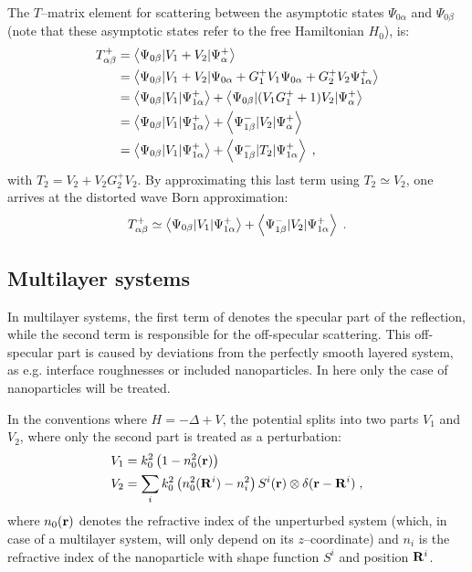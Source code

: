 The $T$--matrix element for scattering between the asymptotic states $\Psi_{0\alpha}$ and $\Psi_{0\beta}$ (note that these asymptotic states refer to the free Hamiltonian $H_0$), is:
\begin{align*}
  T^+_{\alpha\beta} &= \left\langle \Psi_{0\beta} \vert V_1+V_2 \vert \Psi^+_\alpha \right\rangle \nonumber \\
  & = \left\langle \Psi_{0\beta} \vert V_1+V_2 \vert \Psi_{0\alpha} + G^+_1V_1\Psi_{0\alpha} + G^+_2V_2\Psi^+_{1\alpha} \right\rangle \nonumber \\
  & = \left\langle \Psi_{0\beta} \vert V_1 \vert \Psi^+_{1\alpha} \right\rangle + \left\langle \Psi_{0\beta} \vert (V_1G^+_1 + 1)V_2 \vert \Psi^+_\alpha \right\rangle \\
  & = \left\langle \Psi_{0\beta} \vert V_1 \vert \Psi^+_{1\alpha} \right\rangle + \left\langle \Psi^-_{1\beta} \vert V_2 \vert \Psi^+_\alpha \right\rangle \nonumber \\
  & = \left\langle \Psi_{0\beta} \vert V_1 \vert \Psi^+_{1\alpha} \right\rangle + \left\langle \Psi^-_{1\beta} \vert T_2 \vert \Psi^+_{1\alpha} \right\rangle \; ,
\end{align*}
with $T_2 = V_2 + V_2G^+_2V_2$. By approximating this last term using $T_2 \simeq V_2$, one arrives at the distorted wave Born approximation:
\begin{equation*}
  \label{eq:tdwba}
   T^+_{\alpha\beta} \simeq \left\langle \Psi_{0\beta} \vert V_1 \vert \Psi^+_{1\alpha} \right\rangle + \left\langle \Psi^-_{1\beta} \vert V_2 \vert \Psi^+_{1\alpha} \right\rangle \; .
\end{equation*}

\subsection{Multilayer systems}
In multilayer systems, the first term of  denotes the specular part of the reflection, while the second term is responsible for the off-specular scattering. This off-specular part is caused by deviations from the perfectly smooth layered system, as e.g. interface roughnesses or included nanoparticles. In here only the case of nanoparticles will be treated.

In the conventions where $H=-\Delta + V$, the potential splits into two parts $V_1$ and $V_2$, where only the second part is treated as a perturbation:
\begin{align*}
  V_1 & = k_0^2\left( 1-n_0^2(\mathbf{r})\right)  \\
  V_2 & = \sum_i k_0^2\left( n_0^2(\mathbf{R}^i) - n_i^2 \right) S^i(\mathbf{r}) \otimes \delta(\mathbf{r}-\mathbf{R}^i) \; ,
\end{align*}
where $n_0(\mathbf{r})$ denotes the refractive index of the unperturbed system (which, in case of a multilayer system, will only depend on its $z$--coordinate) and $n_i$ is the refractive index of the nanoparticle with shape function $S^i$ and position $\mathbf{R}^i$.

